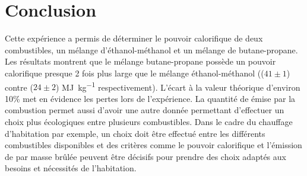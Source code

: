 \section{Conclusion}

Cette expérience a permis de déterminer le pouvoir calorifique de deux combustibles, un mélange d'éthanol-méthanol et un mélange de butane-propane. Les résultats montrent que le mélange butane-propane possède un pouvoir calorifique presque 2 fois plus large que le mélange éthanol-méthanol ((\(41 \pm 1\)) contre (\(24 \pm 2\)) \si{\mega\joule\per\kilo\gram} respectivement). L'écart à la valeur théorique d'environ 10\% met en évidence les pertes lors de l'expérience. La quantité de  émise par la combustion permet aussi d'avoir une autre donnée permettant d'effectuer un choix plus écologiques entre plusieurs combustibles. Dans le cadre du chauffage d'habitation par exemple, un choix doit être effectué entre les différents combustibles disponibles et des critères comme le pouvoir calorifique et l'émission de  par masse brûlée peuvent être décisifs pour prendre des choix adaptés aux besoins et nécessités de l'habitation.